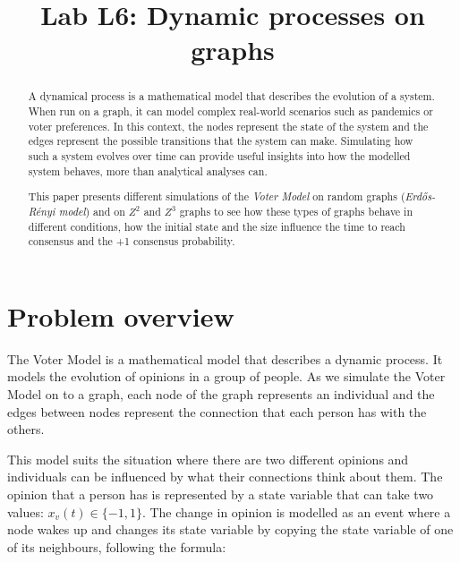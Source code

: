 \documentclass[conference]{IEEEtran}
\begin{document}
\title{
Lab L6: Dynamic processes on graphs
}

\author{
}

\maketitle
\begin{abstract}
A dynamical process is a mathematical model that describes the evolution of a system.
%
When run on a graph, it can model complex real-world scenarios such as pandemics or voter preferences.
%
In this context, the nodes represent the state of the system and the edges represent the possible transitions that the system can make. 
%
Simulating how such a system evolves over time can provide useful insights into how the modelled system behaves, more than analytical analyses can. 

This paper presents different simulations of the \textit{Voter Model} on random graphs (\textit{Erdős-Rényi model}) and on $Z^2$ and $Z^3$ graphs to see how these types of graphs behave in different conditions, how the initial state and the size influence the time to reach consensus and the +1 consensus probability.

\end{abstract}

\section{Problem overview}

The Voter Model is a mathematical model that describes a dynamic process.
%
It models the evolution of opinions in a group of people.  
%
As we simulate the Voter Model on to a graph, each node of the graph represents an individual and the edges between nodes represent the connection that each person has with the others.

This model suits the situation where there are two different opinions and individuals can be influenced by what their connections think about them. 
%
The opinion that a person has is represented by a state variable that can take two values: $ x_v(t) \in \{-1,1\}$.
%
The change in opinion is modelled as an event where a node wakes up and changes its state variable by copying the state variable of one of its neighbours, following the formula:
\end{document}
